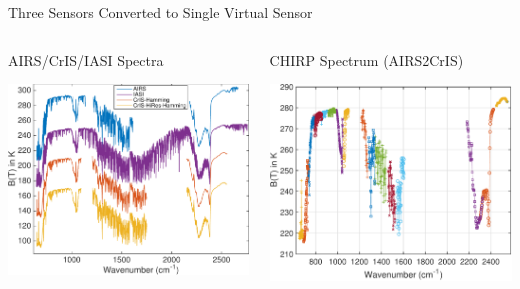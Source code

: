 \documentclass[10pt,t]{beamer}
\begin{document}
\begin{frame}[label={sec:orga0cbe7d}]{Three Sensors Converted to Single Virtual Sensor}
\vspace{-0.2in}
\begin{columns}
\begin{column}{0.55\columnwidth}
\begin{block}{AIRS/CrIS/IASI Spectra}
\begin{center}
\includegraphics[width=\linewidth]{./Figs/Pdf/hyperall_hamming.pdf}
\end{center}
\end{block}
\end{column}


\begin{column}{0.55\columnwidth}
\begin{block}{CHIRP Spectrum (AIRS2CrIS)}
\begin{center}
\includegraphics[width=\linewidth]{./Figs/Pdf/a2c_full.pdf}
\end{center}
\end{block}
\end{column}
\end{columns}


\end{frame}
\end{document}
